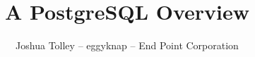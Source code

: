 \documentclass{beamer}
\begin{document}
\title{A PostgreSQL Overview}
\author{Joshua Tolley -- eggyknap -- End Point Corporation}

\end{document}
